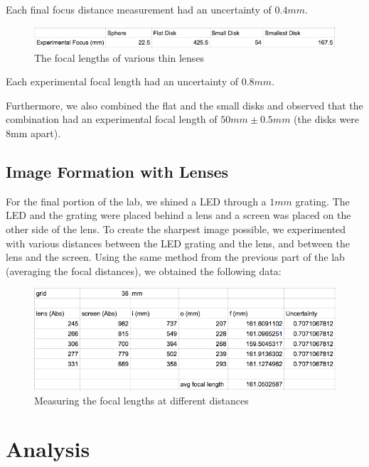 \documentclass{article}
\begin{document}
Each final focus distance measurement had an uncertainty of $0.4mm$.

\begin{figure}[H]
    \centering
    \includegraphics[width=\textwidth]{charts/thin_lenses_results}
    \caption{The focal lengths of various thin lenses}
    \label{thin_lenses_results}
\end{figure}

Each experimental focal length had an uncertainty of $0.8mm$.

Furthermore, we also combined the flat and the small disks and observed that the
combination had an experimental focal length of $50mm \pm 0.5mm$ (the disks were
8mm apart).

\subsection{Image Formation with Lenses}

For the final portion of the lab, we shined a LED through a $1mm$ grating.
The LED and the grating were placed behind a lens and a screen was placed on the
other side of the lens. To create the sharpest image possible, we experimented
with various distances between the LED grating and the lens, and between the
lens and the screen. Using the same method from the previous part of the lab
(averaging the focal distances), we obtained the following data:

\begin{figure}[H]
    \centering
    \includegraphics[width=\textwidth]{charts/image_formation}
    \caption{Measuring the focal lengths at different distances}
    \label{image_formation}
\end{figure}

\section{Analysis}
\end{document}
